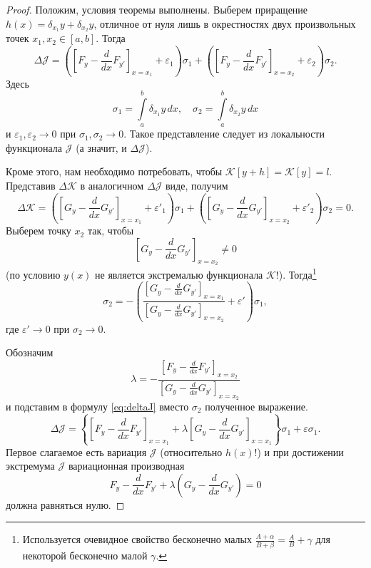 \begin{proof}
  Положим, условия теоремы выполнены. Выберем приращение $ h(x) = \delta_{x_1}y
  + \delta_{x_2}y$, отличное от
  нуля лишь в окрестностях двух произвольных точек $ x_1, x_2 \in [a, b] $.
  Тогда 
  \begin{equation}\label{eq:deltaJ}
    \Delta \mathscr J = \left( \left[ F_y - \frac{d}{dx}F_{y'} \right]_{x=x_1} +
    \varepsilon_1\right)\sigma_1 + \left( \left[ F_y - \frac{d}{dx}F_{y'}
      \right]_{x=x_2} +
    \varepsilon_2\right)\sigma_2.
  \end{equation}
 Здесь  
 \[
   \sigma_1 = \int\limits_{a}^{b}\delta_{x_1}y\,dx, \quad \sigma_2 =
   \int\limits_{a}^{b}\delta_{x_2}y\,dx
 \]
 и $ \varepsilon_1, \varepsilon_2 \to 0 $ при $ \sigma_1, \sigma_2 \to 0 $.
 Такое представление следует из локальности функционала $ \mathscr J $ (а
 значит, и $ \Delta \mathscr J $).

 Кроме этого, нам необходимо потребовать, чтобы $ \mathscr K[y+h] = \mathscr K[y] = l $.
Представив $\Delta \mathscr K $ в аналогичном $ \Delta \mathscr J $ виде,
получим 
\[
        \Delta \mathscr K = \left( \left[ G_y - \frac{d}{dx}G_{y'} \right]_{x=x_1} +
    \varepsilon'_1\right)\sigma_1 + \left( \left[ G_y - \frac{d}{dx}G_{y'}
      \right]_{x=x_2} +
    \varepsilon'_2\right)\sigma_2 = 0.
\]
Выберем точку $ x_2 $ так, чтобы  
\[
  \left[ G_y - \frac{d}{dx}G_{y'} \right]_{x=x_2} \neq 0
\]
(по условию $ y(x) $ не является экстремалью функционала $ \mathscr K $!).
Тогда\footnote{Используется очевидное свойство бесконечно малых $ \frac{A +
  \alpha}{B + \beta} = \frac{A}{B} + \gamma $ для некоторой бесконечно малой $
\gamma $.}
\[
  \sigma_2 = - \left( \frac{ \left[ G_y - \frac{d}{dx} G_{y'} \right]_{x=x_1}
  }{ \left[ G_y - \frac{d}{dx}G_{y'} \right]_{x=x_2}} + \varepsilon'
\right)\sigma_1,
\]
где $ \varepsilon' \to 0 $ при $ \sigma_2 \to 0 $.

Обозначим  
\[
  \lambda = - \frac{ \left[ F_y - \frac{d}{dx}F_{y'} \right]_{x=x_2}}{ \left[
  G_y - \frac{d}{dx}G_{y'} \right]_{x=x_2}}
\]
и подставим в формулу \eqref{eq:deltaJ} вместо $ \sigma_2 $ полученное
выражение.  
\[
  \Delta \mathscr J = \left\{ \left[ F_y - \frac{d}{dx}F_{y'} \right]_{x=x_1} +
  \lambda \left[ G_y - \frac{d}{dx}G_{y'} \right]_{x=x_1}\right\}\sigma_1 +
  \varepsilon \sigma_1.
\]
Первое слагаемое есть вариация $ \mathscr J $ (относительно $h(x)$!) и при
достижении экстремума
$ \mathscr J $ вариационная производная  
\[
  F_y - \frac{d}{dx} F_{y'} + \lambda \left( G_y - \frac{d}{dx} G_{y'} \right)
  = 0
\]
 должна равняться нулю.
\end{proof}
